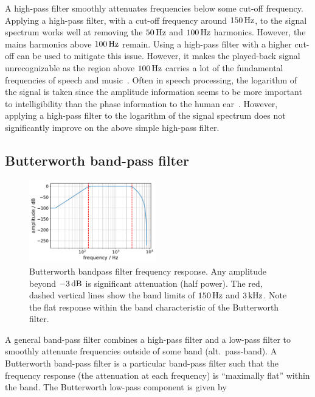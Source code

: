 \documentclass[aps,pra,superscriptaddress,reprint,nofootinbib]{revtex4-1}
\begin{document}
A high-pass filter smoothly attenuates frequencies below some cut-off frequency. 
Applying a high-pass filter, with a cut-off frequency around $150\,{\rm Hz}$, to the signal spectrum works well at removing the $50\,{\rm Hz}$ and $100\,{\rm Hz}$ harmonics. However, the mains harmonics above $100\,{\rm Hz}$ remain. Using a high-pass filter with a higher cut-off can be used to mitigate this issue. However, it makes the played-back signal unrecognizable as the region above $100\,{\rm Hz}$ carries a lot of the fundamental frequencies of speech and music~\cite{speech_intelligibility}.
Often in speech processing, the logarithm of the signal is taken since the amplitude information seems to be more important to intelligibility than the phase information to the human ear~\cite{SubjectiveComparison}. However, applying a high-pass filter to the logarithm of the signal spectrum does not significantly improve on the above simple high-pass filter.


\subsection{Butterworth band-pass filter}

\begin{figure}
	\includegraphics[width=0.49\textwidth]{figures/butterworth_150_3000.pdf}
	\caption{Butterworth bandpass filter frequency response. Any amplitude beyond $-3\,{\rm dB}$ is significant attenuation (half power). The red, dashed vertical lines show the band limits of $150\,{\rm Hz}$ and $3\,{\rm kHz}$. Note the flat response within the band characteristic of the Butterworth filter.}
	\label{fig:butterworth}
\end{figure}

A general band-pass filter combines a high-pass filter and a low-pass filter to smoothly attenuate frequencies outside of some band (alt.\ pass-band). A Butterworth band-pass filter is a particular band-pass filter such that the frequency response (the attenuation at each frequency) is ``maximally flat'' within the band. The Butterworth low-pass component is given by %
\end{document}
